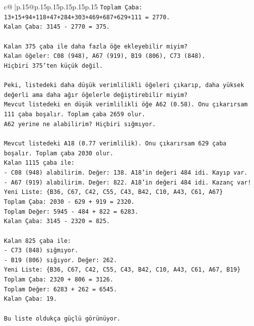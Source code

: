 \documentclass{article}
\begin{document}
{\begin{supertabular}{c@{$\;$}|p{.15\linewidth}@{}p{.15\linewidth}p{.15\linewidth}p{.15\linewidth}p{.15\linewidth}p{.15\linewidth}}
{{{\texttt{Toplam Çaba: 13+15+94+118+47+284+303+469+687+629+111 = 2770.} \\
\texttt{Kalan Çaba: 3145 {-} 2770 = 375.} \\
\\ 
\texttt{Kalan 375 çaba ile daha fazla öğe ekleyebilir miyim?} \\
\texttt{Kalan öğeler: C08 (948), A67 (919), B19 (806), C73 (848).} \\
\texttt{Hiçbiri 375'ten küçük değil.} \\
\\ 
\texttt{Peki, listedeki daha düşük verimlilikli öğeleri çıkarıp, daha yüksek değerli ama daha ağır öğelerle değiştirebilir miyim?} \\
\texttt{Mevcut listedeki en düşük verimlilikli öğe A62 (0.58). Onu çıkarırsam 111 çaba boşalır. Toplam çaba 2659 olur.} \\
\texttt{A62 yerine ne alabilirim? Hiçbiri sığmıyor.} \\
\\ 
\texttt{Mevcut listedeki A18 (0.77 verimlilik). Onu çıkarırsam 629 çaba boşalır. Toplam çaba 2030 olur.} \\
\texttt{Kalan 1115 çaba ile:} \\
\texttt{{-} C08 (948) alabilirim. Değer: 138. A18'in değeri 484 idi. Kayıp var.} \\
\texttt{{-} A67 (919) alabilirim. Değer: 822. A18'in değeri 484 idi. Kazanç var!} \\
\texttt{Yeni Liste: \{B36, C67, C42, C55, C43, B42, C10, A43, C61, A67\}} \\
\texttt{Toplam Çaba: 2030 {-} 629 + 919 = 2320.} \\
\texttt{Toplam Değer: 5945 {-} 484 + 822 = 6283.} \\
\texttt{Kalan Çaba: 3145 {-} 2320 = 825.} \\
\\ 
\texttt{Kalan 825 çaba ile:} \\
\texttt{{-} C73 (848) sığmıyor.} \\
\texttt{{-} B19 (806) sığıyor. Değer: 262.} \\
\texttt{Yeni Liste: \{B36, C67, C42, C55, C43, B42, C10, A43, C61, A67, B19\}} \\
\texttt{Toplam Çaba: 2320 + 806 = 3126.} \\
\texttt{Toplam Değer: 6283 + 262 = 6545.} \\
\texttt{Kalan Çaba: 19.} \\
\\ 
\texttt{Bu liste oldukça güçlü görünüyor.} \\
}}}
\end{supertabular}}
\end{document}
